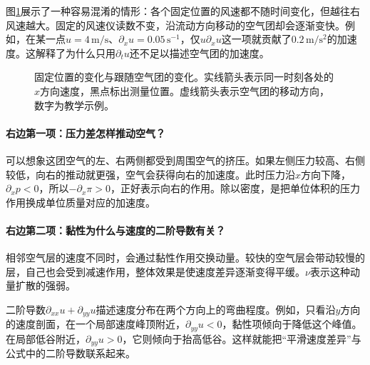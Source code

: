 图\ref{fig:pinn-material-acceleration}展示了一种容易混淆的情形：各个固定位置的风速都不随时间变化，但越往右风速越大。固定的风速仪读数不变，沿流动方向移动的空气团却会逐渐变快。例如，在某一点$u=4\,\mathrm{m/s}$、$\partial_xu=0.05\,\mathrm{s^{-1}}$，仅$u\partial_xu$这一项就贡献了$0.2\,\mathrm{m/s^2}$的加速度。这解释了为什么只用$\partial_tu$还不足以描述空气团的加速度。

\begin{figure}[htbp]
\centering
{}
\caption{固定位置的变化与跟随空气团的变化。实线箭头表示同一时刻各处的$x$方向速度，黑点标出测量位置。虚线箭头表示空气团的移动方向，数字为教学示例。}
\label{fig:pinn-material-acceleration}
\end{figure}

\paragraph{右边第一项：压力差怎样推动空气？}
可以想象这团空气的左、右两侧都受到周围空气的挤压。如果左侧压力较高、右侧较低，向右的推动就更强，空气会获得向右的加速度。此时压力沿$x$方向下降，$\partial_xp<0$，所以$-\partial_x\pi>0$，正好表示向右的作用。除以密度，是把单位体积的压力作用换成单位质量对应的加速度。

\paragraph{右边第二项：黏性为什么与速度的二阶导数有关？}
相邻空气层的速度不同时，会通过黏性作用交换动量。较快的空气层会带动较慢的层，自己也会受到减速作用，整体效果是使速度差异逐渐变得平缓。$\nu$表示这种动量扩散的强弱。

二阶导数$\partial_{xx}u+\partial_{yy}u$描述速度分布在两个方向上的弯曲程度。例如，只看沿$y$方向的速度剖面，在一个局部速度峰顶附近，$\partial_{yy}u<0$，黏性项倾向于降低这个峰值。在局部低谷附近，$\partial_{yy}u>0$，它则倾向于抬高低谷。这样就能把“平滑速度差异”与公式中的二阶导数联系起来。

